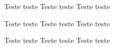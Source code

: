 \documentclass[a4paper]{article}
\begin{document}
\maketitle
 
\exercicio \lipsum[1-2]
\exercicio \lipsum[3]
\exercicio Teste teste
\exercicio Teste teste
\exercicio Teste teste
\exercicio \lipsum[4]
\exercicio \lipsum[5-8]
\exercicio \lipsum[10]

\begin{respostas}
  \exercicio \lipsum[1-2]
  \exercicio \lipsum[3]
  \exercicio \lipsum[4]
  \exercicio \lipsum[5-8]
  \exercicio Teste teste
  \exercicio Teste teste
  \exercicio Teste teste
  \exercicio \lipsum[10]
\end{respostas}

\begin{resolucoes}
  \exercicio \lipsum[1-2]
  \exercicio \lipsum[3]
  \exercicio \lipsum[4]
  \exercicio \lipsum[5-8]
  \exercicio \lipsum[9]
  \exercicio Teste teste
  \exercicio Teste teste
  \exercicio Teste teste
\end{resolucoes}
\end{document}
